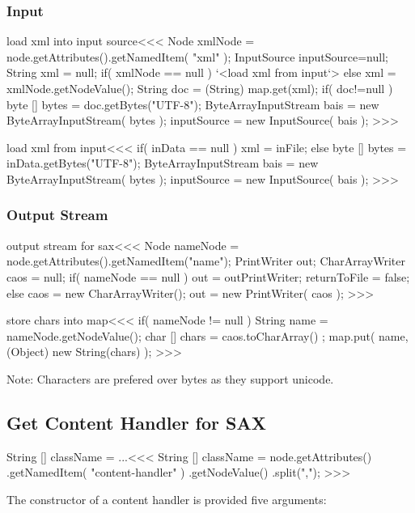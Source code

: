 \documentclass{article}
\begin{document}
{%
\subsubsection{Input}


\<load xml into input source\><<<
Node xmlNode = node.getAttributes().getNamedItem( "xml" );
InputSource inputSource=null;
String xml = null;
if( xmlNode == null ){
   `<load xml from input`>
} else {
   xml = xmlNode.getNodeValue();
   String doc = (String) map.get(xml);
   if( doc!=null ){
      byte [] bytes = doc.getBytes("UTF-8");
      ByteArrayInputStream bais = new ByteArrayInputStream( bytes );
      inputSource = new InputSource( bais );
}  }
>>>


\<load xml from input\><<<
if( inData == null ){
   xml = inFile;
} else {
   byte [] bytes = inData.getBytes("UTF-8");
   ByteArrayInputStream bais = new ByteArrayInputStream( bytes );
   inputSource = new InputSource( bais );
}
>>>


\subsubsection{Output Stream}


\<output stream for sax\><<<
Node nameNode = node.getAttributes().getNamedItem("name");
PrintWriter out;
CharArrayWriter caos = null;
if( nameNode == null ){
   out = outPrintWriter;
   returnToFile = false;
} else {
   caos = new CharArrayWriter();
   out = new PrintWriter( caos );
}
>>>

\<store chars into map\><<<
if( nameNode != null ){
   String name = nameNode.getNodeValue();
   char [] chars = caos.toCharArray() ;
   map.put( name, (Object) new String(chars) );
}
>>>

Note: Characters are prefered over bytes as they support
unicode.

\subsection{Get Content Handler for SAX}

\<String [] className = ...\><<<
String [] className = node.getAttributes()
                     .getNamedItem( "content-handler" )
                     .getNodeValue()
                     .split(",");
>>>




The constructor of a content handler is provided five arguments:

}
\end{document}
